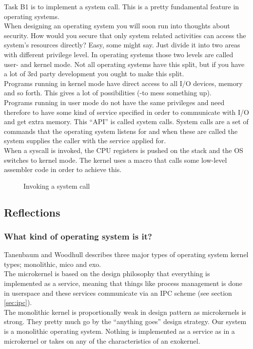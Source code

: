 Task B1 is to implement a system call. This is a pretty fundamental feature in operating systems.\\

When designing an operating system you will soon run into thoughts about security. How would you secure that only system related activities
can access the system's resources directly? Easy, some might say. Just divide it into two areas with different privilege level. 
In operating systems those two levels are called user- and kernel mode. Not all operating systems have this split, but if you have a
 lot of 3rd party development you ought to make this split.\\
Programs running in kernel mode have direct access to all I/O devices, memory and so forth. This gives a lot of possibilities (-to mess something up).\\
Programs running in user mode do not have the same privileges and need therefore to have some kind of service specified in order to communicate with I/O and get extra memory. This ``API'' is called system calls. System calls are a set of commands that the operating system listens for and when these are called the system supplies the caller with the service applied for.\\
When a syscall is invoked, the CPU registers is pushed on the stack and the OS switches to kernel mode. The kernel uses a macro that calls some low-level assembler code in order to achieve this.


\begin{figure}
\centering
{}
\caption{Invoking a system call}
\label{fig:kernel_mode}
\end{figure}

\subsection{Reflections}

\subsubsection*{What kind of operating system is it?}
Tanenbaum and Woodhull describes three major types of operating system kernel types; monolithic, mico and exo.\\
The microkernel is based on the design philosophy that everything is implemented as a service, meaning that things like process management is done
in userspace and these services communicate via an IPC scheme (see section \ref{sec:ipc}).\\
The monolithic kernel is proportionally weak in design pattern as microkernels is strong. They pretty much go by the ``anything goes'' design 
strategy. Our system is a monolithic operating system. Nothing is implemented as a service as in a microkernel or takes on any of the
characteristics of an exokernel.


